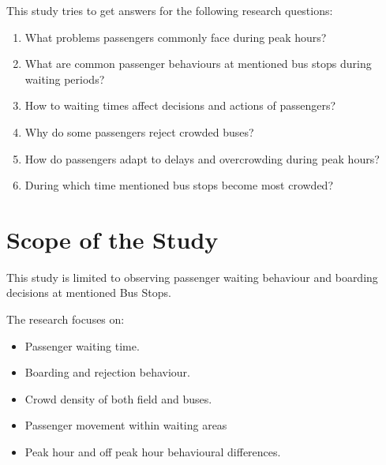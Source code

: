 \documentclass[12pt,a4paper]{report}
\begin{document}
This study tries to get answers for the following research questions:

\begin{enumerate}[noitemsep]

\item What problems passengers commonly face during peak hours?

\item What are common passenger behaviours at mentioned bus stops during waiting periods?

\item How to waiting times affect decisions and actions of passengers?

\item Why do some passengers reject crowded buses?

\item How do passengers adapt to delays and overcrowding during peak hours?

\item During which time mentioned bus stops become most crowded?

\end{enumerate}


\section{Scope of the Study}

This study is limited to observing passenger waiting behaviour and boarding decisions at
mentioned Bus Stops.

The research focuses on:

\begin{itemize}[noitemsep]

\item Passenger waiting time.

\item Boarding and rejection behaviour.

\item Crowd density of both field and buses.

\item Passenger movement within waiting areas

\item Peak hour and off peak hour behavioural differences.

\end{itemize}
\end{document}
